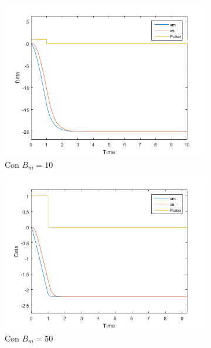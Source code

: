 \documentclass[a4paper, fontsize=11pt]{scrartcl} %
\numberwithin{equation}{section} %
\numberwithin{figure}{section} %
\numberwithin{table}{section} %
\begin{document}
	\begin{figure}[h!]
		\centering
		\begin{subfigure}[t]{.5\textwidth}
			\centering
			\includegraphics[width=1\linewidth]{images/Bm10.PNG}
			\caption{Con $B_m = 10$}
			\label{Bm10}
		\end{subfigure}%
		\begin{subfigure}[t]{.5\textwidth}
			\centering
			\includegraphics[width=1\linewidth]{images/Bm50.PNG}
			\caption{Con $B_m = 50$}
			\label{Bm50}
		\end{subfigure}
		\begin{subfigure}[t]{.5\textwidth}
			\centering

\end{subfigure}
\end{figure}
\end{document}

